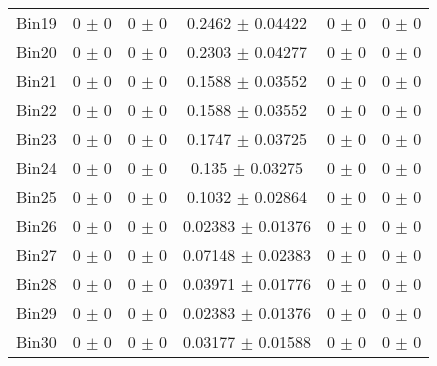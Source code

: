 \begin{tabular}{@{\extracolsep{4pt}}lccccc@{}}
     Bin19 & 0 $\pm$ 0 & 0 $\pm$ 0 & 0.2462 $\pm$ 0.04422 & 0 $\pm$ 0 & 0 $\pm$ 0 \\ 
     Bin20 & 0 $\pm$ 0 & 0 $\pm$ 0 & 0.2303 $\pm$ 0.04277 & 0 $\pm$ 0 & 0 $\pm$ 0 \\ 
     Bin21 & 0 $\pm$ 0 & 0 $\pm$ 0 & 0.1588 $\pm$ 0.03552 & 0 $\pm$ 0 & 0 $\pm$ 0 \\ 
     Bin22 & 0 $\pm$ 0 & 0 $\pm$ 0 & 0.1588 $\pm$ 0.03552 & 0 $\pm$ 0 & 0 $\pm$ 0 \\ 
     Bin23 & 0 $\pm$ 0 & 0 $\pm$ 0 & 0.1747 $\pm$ 0.03725 & 0 $\pm$ 0 & 0 $\pm$ 0 \\ 
     Bin24 & 0 $\pm$ 0 & 0 $\pm$ 0 & 0.135 $\pm$ 0.03275 & 0 $\pm$ 0 & 0 $\pm$ 0 \\ 
     Bin25 & 0 $\pm$ 0 & 0 $\pm$ 0 & 0.1032 $\pm$ 0.02864 & 0 $\pm$ 0 & 0 $\pm$ 0 \\ 
     Bin26 & 0 $\pm$ 0 & 0 $\pm$ 0 & 0.02383 $\pm$ 0.01376 & 0 $\pm$ 0 & 0 $\pm$ 0 \\ 
     Bin27 & 0 $\pm$ 0 & 0 $\pm$ 0 & 0.07148 $\pm$ 0.02383 & 0 $\pm$ 0 & 0 $\pm$ 0 \\ 
     Bin28 & 0 $\pm$ 0 & 0 $\pm$ 0 & 0.03971 $\pm$ 0.01776 & 0 $\pm$ 0 & 0 $\pm$ 0 \\ 
     Bin29 & 0 $\pm$ 0 & 0 $\pm$ 0 & 0.02383 $\pm$ 0.01376 & 0 $\pm$ 0 & 0 $\pm$ 0 \\ 
     Bin30 & 0 $\pm$ 0 & 0 $\pm$ 0 & 0.03177 $\pm$ 0.01588 & 0 $\pm$ 0 & 0 $\pm$ 0 \\ 
\hline\hline
  \end{tabular}

